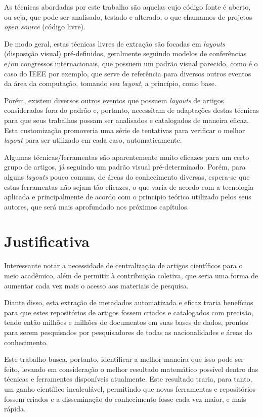 As técnicas abordadas por este trabalho são aquelas cujo código fonte é aberto, ou seja, que pode ser analisado, testado e alterado, o que chamamos de projetos \textit{open source} (código livre). 

De modo geral, estas técnicas livres de extração são focadas em \textit{layouts} (disposição visual) pré-definidos, geralmente seguindo modelos de conferências e/ou congressos internacionais, que possuem um padrão visual parecido, como é o caso do IEEE por exemplo, que serve de referência para diversos outros eventos da área da computação, tomando seu \textit{layout}, a princípio, como base.

Porém, existem diversos outros eventos que possuem \textit{layouts} de artigos considerados fora do padrão e, portanto, necessitam de adaptações destas técnicas para que seus trabalhos possam ser analisados e catalogados de maneira eficaz. Esta customização promoveria uma série de tentativas para verificar o melhor \textit{layout} para ser utilizado em cada caso, automaticamente.

Algumas técnicas/ferramentas são aparentemente muito eficazes para um certo grupo de artigos, já seguindo um padrão visual pré-determinado. Porém, para alguns \textit{layouts} pouco comuns, de áreas do conhecimento diversas, espera-se que estas ferramentas não sejam tão eficazes, o que varia de acordo com a tecnologia aplicada e principalmente de acordo com o princípio teórico utilizado pelos seus autores, que será mais aprofundado nos próximos capítulos.

\section{Justificativa}

Interessante notar a necessidade de centralização de artigos científicos para o meio acadêmico, além de permitir à contribuição coletiva, que seria uma forma de aumentar cada vez mais o acesso aos materiais de pesquisa. 

Diante disso, esta extração de metadados automatizada e eficaz traria benefícios para que estes repositórios de artigos fossem criados e catalogados com precisão, tendo então milhões e milhões de documentos em suas bases de dados, prontos para serem pesquisados por pesquisadores de todas as nacionalidades e áreas do conhecimento.

Este trabalho busca, portanto, identificar a melhor maneira que isso pode ser feito, levando em consideração o melhor resultado matemático possível dentro das técnicas e ferramentes disponíveis atualmente. Este resultado traria, para tanto, um ganho científico incalculável, permitindo que novas ferramentas e repositórios fossem criados e a disseminação do conhecimento fosse cada vez maior, e mais rápida. 

